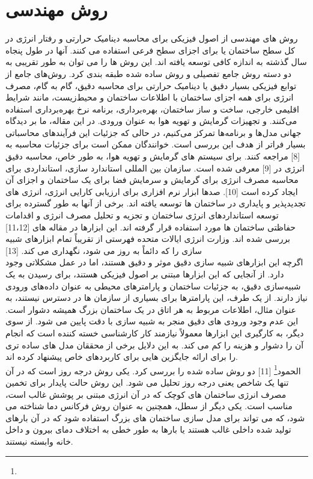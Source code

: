 \section{روش مهندسی}


روش های مهندسی از اصول فیزیکی برای محاسبه دینامیک حرارتی و رفتار انرژی در کل سطح ساختمان یا برای اجزای سطح فرعی استفاده می کنند. آنها در طول پنجاه سال گذشته به اندازه کافی توسعه یافته اند. این روش ها را می توان به طور تقریبی به دو دسته روش جامع تفصیلی و روش ساده شده طبقه بندی کرد. روش‌های جامع از توابع فیزیکی بسیار دقیق یا دینامیک حرارتی برای محاسبه دقیق، گام به گام، مصرف انرژی برای همه اجزای ساختمان با اطلاعات ساختمان و محیط‌زیست، مانند شرایط اقلیمی خارجی، ساخت و ساز ساختمان، بهره‌برداری، برنامه نرخ بهره‌برداری استفاده می‌کنند. و تجهیزات گرمایش و تهویه هوا به عنوان ورودی. در این مقاله، ما بر دیدگاه جهانی مدل‌ها و برنامه‌ها تمرکز می‌کنیم، در حالی که جزئیات این فرآیندهای محاسباتی بسیار فراتر از هدف این بررسی است. خوانندگان ممکن است برای جزئیات محاسبه به [8] مراجعه کنند. برای سیستم های گرمایش و تهویه هوا، به طور خاص، محاسبه دقیق انرژی در [9] معرفی شده است. سازمان بین المللی استاندارد سازی، استانداردی برای محاسبه مصرف انرژی برای گرمایش و سرمایش فضا برای یک ساختمان و اجزای آن ایجاد کرده است [10]. صدها ابزار نرم افزاری برای ارزیابی کارایی انرژی، انرژی های تجدیدپذیر و پایداری در ساختمان ها توسعه یافته اند. برخی از آنها به طور گسترده برای توسعه استانداردهای انرژی ساختمان و تجزیه و تحلیل مصرف انرژی و اقدامات حفاظتی ساختمان ها مورد استفاده قرار گرفته اند. این ابزارها در مقاله های [11،12] بررسی شده اند. وزارت انرژی ایالات متحده فهرستی از تقریباً تمام ابزارهای شبیه سازی را که دائماً به روز می شود، نگهداری می کند. [13]
\\
اگرچه این ابزارهای شبیه سازی دقیق موثر و دقیق هستند، اما در عمل مشکلاتی وجود دارد. از آنجایی که این ابزارها مبتنی بر اصول فیزیکی هستند، برای رسیدن به یک شبیه‌سازی دقیق، به جزئیات ساختمان و پارامترهای محیطی به عنوان داده‌های ورودی نیاز دارند. از یک طرف، این پارامترها برای بسیاری از سازمان ها در دسترس نیستند، به عنوان مثال، اطلاعات مربوط به هر اتاق در یک ساختمان بزرگ همیشه دشوار است. این عدم وجود ورودی های دقیق منجر به شبیه سازی با دقت پایین می شود. از سوی دیگر، به کارگیری این ابزارها معمولاً نیازمند کار کارشناسی خسته کننده است که انجام آن را دشوار و هزینه را کم می کند. به این دلایل برخی از محققان مدل های ساده تری را برای ارائه جایگزین هایی برای کاربردهای خاص پیشنهاد کرده اند.
\\
الحمود\footnote{} [11] دو روش ساده شده را بررسی کرد. یکی روش درجه روز است که در آن تنها یک شاخص یعنی درجه روز تحلیل می شود. این روش حالت پایدار برای تخمین مصرف انرژی ساختمان های کوچک که در آن انرژی مبتنی بر پوشش غالب است، مناسب است. یکی دیگر از سطل، همچنین به عنوان روش فرکانس دما شناخته می شود، که می تواند برای مدل سازی ساختمان های بزرگ استفاده شود که در آن بارهای تولید شده داخلی غالب هستند یا بارها به طور خطی به اختلاف دمای بیرون و داخل خانه وابسته نیستند.

